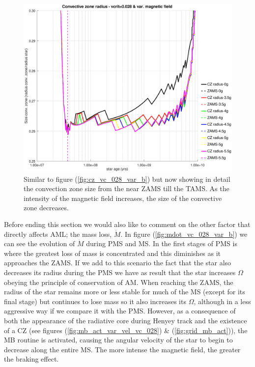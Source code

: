\documentclass[fleqn,usenatbib]{mnras}
\begin{document}
\begin{figure}
	\includegraphics[trim = 30mm 15mm 20mm 15mm, clip,width=\columnwidth]{figures/cz_vc_028_var_g_z1.eps}
    \caption{Similar to figure (\ref{fig:cz_vc_028_var_b}) but now showing in detail the convection zone size from the near ZAMS till the TAMS. As the intensity of the magnetic field increases, the size of the convective zone decreases.}
    \label{fig:cz_vc_028_var_b_z1}
\end{figure}

Before ending this section we would also like to comment on the other factor that directly affects AML; the mass loss, $\Dot{M}$. In figure (\ref{fig:mdot_vc_028_var_b}) we can see the evolution of $\Dot{M}$ during PMS and MS. In the first stages of PMS is where the greatest loss of mass is concentrated and this diminishes as it approaches the ZAMS. If we add to this scenario the fact that the star also decreases its radius during the PMS we have as result that the star increases $\Omega$ obeying the principle of conservation of AM. When reaching the ZAMS, the radius of the star remains more or less stable for much of the MS (except for its final stage) but continues to lose mass so it also increases its $\Omega$, although in a less aggressive way if we compare it with the PMS. However, as a consequence of both the appearance of the radiative core during Henyey track and the existence of a CZ (see figures (\ref{fig:mb_act_var_vel_vc_028}) \& (\ref{fig:grid_mb_act})), the MB routine is activated, causing the angular velocity of the star to begin to decrease along the entire MS. The more intense the magnetic field, the greater the braking effect.\par 
\end{document}
